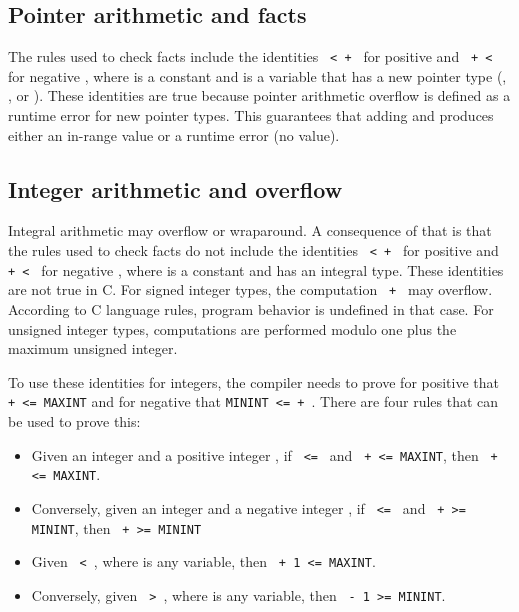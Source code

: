 \subsection{Pointer arithmetic and facts}

The rules used to check facts include the identities \texttt{ <  + }
for positive  and \texttt{ +  < } for
negative , where  is a
constant and  is a variable that has a new pointer type (\ptr,
\arrayview, or \arrayptr). These identities are true
because pointer arithmetic overflow is defined as a runtime error for
new pointer types. This guarantees that adding  and  produces either
an in-range value or a runtime error (no value).

\subsection{Integer arithmetic and overflow}
\label{section:where-clauses-and-overflow}

Integral arithmetic may overflow or wraparound. A consequence of that is
that the rules used to check facts do not include the identities 
\texttt{ <  + } 
for positive  and \texttt{ +  < } for 
negative , where  is a
constant and  has an integral type. These identities are not true in C.  For signed integer types, the computation \texttt{ + }
may overflow.   According to C language
rules, program behavior is undefined in that case.  For unsigned
integer types, computations are performed modulo one plus
the maximum unsigned integer.

To use these identities for integers, the compiler needs to prove for
positive  that \texttt{ +  <= MAXINT} and for negative  that \texttt{MININT <=  + }.  There are four rules that can be used to prove this:

\begin{itemize}
\item
  Given an integer  and a positive integer , if 
  \texttt{ <= } and \texttt{ +  <= MAXINT},
  then \texttt{ +  <= MAXINT}.
\item
  Conversely, given an integer  and a negative integer 
  , if \texttt{ <= } and \texttt{ +
    >= MININT}, then \texttt{ +  >= MININT}
\item
  Given \texttt{ < }, where  is any variable, 
  then \texttt{ + 1 <= MAXINT}.
\item
  Conversely, given \texttt{ > }, where 
  is any variable, then \texttt{ - 1 >= MININT}.
\end{itemize}

